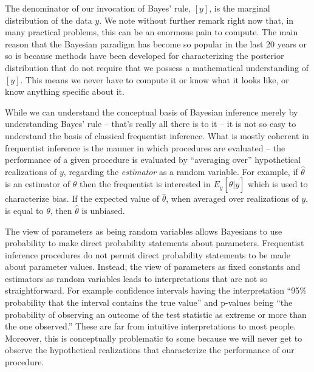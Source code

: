 The denominator of our invocation of Bayes' rule, $[y]$,
is the marginal distribution of the data $y$.  We note without further
remark right now that, in many practical problems, this can be an
enormous pain to compute. The main reason that the Bayesian paradigm
has become so popular in the last 20 years or so is because methods
have been developed
for characterizing the posterior distribution that do not
require that we possess a mathematical understanding of $[y]$. This means
we never have to compute it or know what it looks like, or know
anything specific about it.



While we can understand the conceptual basis of Bayesian inference
merely by understanding Bayes' rule -- that's really all there is to it
-- it is not so easy to understand the basis of classical
frequentist inference. 
What is mostly coherent
in frequentist inference is the manner in which procedures are evaluated -- the performance of a given procedure is
evaluated by ``averaging over'' hypothetical realizations of $y$,
regarding the {\it estimator} as a random variable. For example, if
$\hat{\theta}$ is an estimator of $\theta$ then the frequentist is
interested in $E_{y}[\hat{\theta}|y]$ which is used to characterize
bias. If the expected value of $\hat{\theta}$, when averaged over
realizations of $y$, is equal to $\theta$, then $\hat{\theta}$ is
unbiased.

The view of parameters as being random variables 
allows Bayesians to use probability to make direct probability
statements about parameters. Frequentist inference procedures do not
permit direct probability statements to be made about parameter
values.
Instead, 
the view of parameters as fixed constants and estimators as random variables
leads to interpretations that are not so straightforward. For
example confidence intervals having the interpretation ``95\%
probability that the interval contains the true value'' and p-values
being ``the probability of observing an outcome of the test statistic as extreme or more than
the one observed.'' These are far from intuitive interpretations to
most people.  Moreover, this is conceptually problematic to some
because we will never get to observe the hypothetical realizations that characterize the
performance of our procedure.

